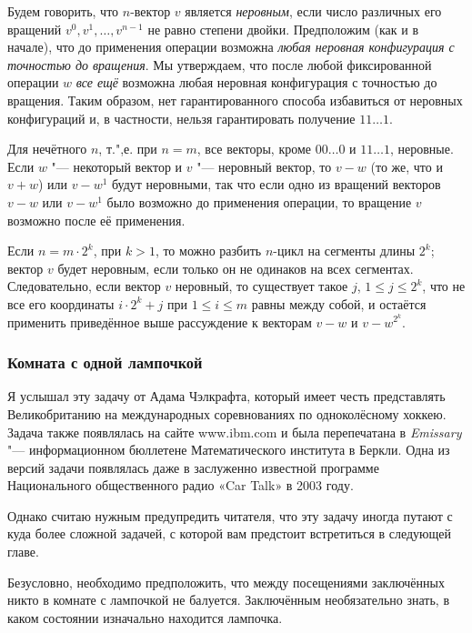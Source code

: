 \documentclass[twoside]{book}
\begin{document}
Будем говорить, что $n$-вектор $v$ является \emph{неровным}, %
если число различных его вращений $v^0,v^1,\dots,v^{n-1}$ не равно степени двойки.
Предположим (как и в начале), что до применения операции возможна \emph{любая неровная конфигурация с точностью до вращения}.
Мы утверждаем, что после любой фиксированной операции $w$ \emph{все ещё} возможна любая неровная конфигурация с точностью до вращения.
Таким образом, нет гарантированного способа избавиться от неровных конфигураций и, в частности, нельзя гарантировать получение $11\dots1$.

Для нечётного $n$, т.",е. при $n=m$, все векторы, кроме $00\dots0$ и $11\dots1$, неровные.
Если $w$ "--- некоторый вектор и $v$ "--- неровный вектор, то $v-w$ (то же, что и $v+w$) или $v-w^1$ будут неровными, так что если одно из вращений векторов $v-w$ или $v-w^1$ было возможно до применения операции, то вращение $v$ возможно после её применения.

Если $n=m\cdot 2^k$, при $k>1$, то можно разбить $n$-цикл на сегменты длины $2^k$; вектор $v$ будет неровным, если только он не одинаков на всех сегментах.
Следовательно, если вектор $v$ неровный, то существует такое $j$, $1\le j\le 2^k$, что не все его координаты $i\cdot 2^k+j$ при $1\le i\le m$ равны между собой, и остаётся применить приведённое выше рассуждение к векторам $v-w$ и $v-w^{2^k}$. %

\subsubsection*{Комната с одной лампочкой}%

Я услышал эту задачу от Адама Чэлкрафта, %
который имеет честь представлять Великобританию на международных соревнованиях по одноколёсному хоккею.
Задача также появлялась на сайте www.ibm.com и была перепечатана в \emph{Emissary} "--- информационном бюллетене Математического института в Беркли. %
Одна из версий задачи появлялась даже в заслуженно известной программе Национального общественного радио «Car Talk» в 2003 году.

Однако считаю нужным предупредить читателя, что эту задачу иногда путают с куда более сложной задачей, с которой вам предстоит встретиться в следующей главе.

\medskip

Безусловно, необходимо предположить, что между посещениями заключённых никто в комнате с лампочкой не балуется.
Заключённым необязательно знать, в каком состоянии изначально находится лампочка.
\end{document}
